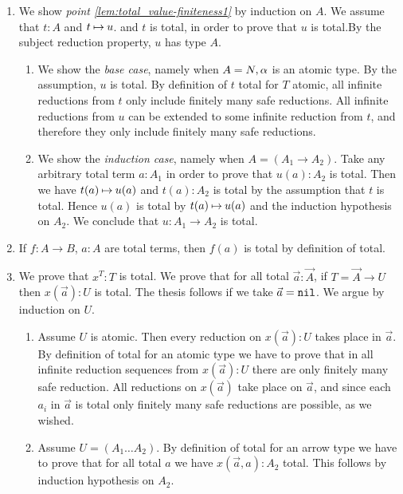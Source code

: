 \documentclass{article}
\newenvironment{proof}[1][Proof]{\begin{trivlist}
\item[\hskip \labelsep {\bfseries #1}]}{\end{trivlist}}
\begin{document}
\begin{proof}
\begin{enumerate}

\item
  We show \emph{point \ref{lem:total_value-finiteness1}}  by induction on $A$. 
We assume that $t:A$ and $t \mathbin{\mapsto} u$.
    and $t$ is total, in order to prove that $u$ is total.By the subject reduction property, $u$ has type $A$.
\begin{enumerate}
\item
  We show the \emph{base case}, namely when $A ={N},\alpha$ is an atomic type.
  By the assumption, $u$ is total.
  By definition of $t$ total for $T$ atomic, all infinite 
  reductions from $t$ only include finitely many safe reductions.
  All infinite reductions from $u$ can be extended to some infinite reduction from $t$, and therefore they
  only include finitely many safe reductions.
\item
  We show the \emph{induction case}, namely when $A = (A_1\rightarrow A_2)$.
  Take any arbitrary total term $a:A_1$ in order to prove that $u(a):A_2$ is total. 
  Then we have $t(a) \mathbin{\mapsto} u(a)$ and 
  $t(a):A_2$ is total by the assumption that $t$ is total.
  Hence $u(a)$ is total by $t(a) \mathbin{\mapsto} u(a)$ and the induction hypothesis on $A_2$. 
  We conclude that $u:A_1\rightarrow A_2$ is total. 
\end{enumerate}

  \item
If $f:A \rightarrow B$, $a:A$ are total  terms, then $f(a)$  is total by definition of total.

\item
We prove that $x^T:T$ is total. 
We prove that for all total $\vec{a}:\vec{A}$, if $T = \vec{A} \rightarrow U$ then $x(\vec{a}):U$
is total. The thesis follows if we take $\vec{a} = {\tt nil}$. We argue by induction on $U$. 

\begin{enumerate}
\item
Assume $U$ is atomic. Then every reduction on $x(\vec{a}):U$
takes place in $\vec{a}$. By definition of total
for an atomic type we have to prove that in all infinite reduction sequences from $x(\vec{a}):U$ 
there are only finitely many safe reduction. All reductions on $x(\vec{a})$ take place on $\vec{a}$,
and since each $a_i$ in $\vec{a}$ is total only finitely many safe reductions are possible, as we wished.
\item
Assume $U = (A_1 \ldots A_2)$. By definition of total
for an arrow type we have to prove that for all total $a$ we have  $x(\vec{a},a):A_2$ total.
This follows by induction hypothesis on $A_2$.
\end{enumerate}


\end{enumerate}
\end{proof}
\end{document}
